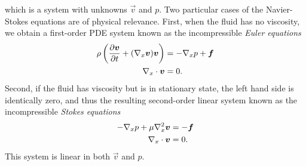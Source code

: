 which is a system with unknowns $\vec v$ and $p$. Two particular cases of the Navier-Stokes equations are of physical relevance. First, when the fluid has no viscosity, we obtain a first-order PDE system known as the incompressible \textit{Euler equations}
\begin{align*}
    \rho\left(\frac{\partial \vec v}{\partial t} + (\vx\vec v)\vec v\right) &= -\vx p + \vec f\\
    \vx\cdot\vec v &= 0.
\end{align*} 
Second, if the fluid has viscosity but is in stationary state, the left hand side is identically zero, and thus the resulting second-order linear system known as the incompressible \textit{Stokes equations}
\begin{align*}
    -\vx p + \mu\vx^2 \vec v &= - \vec f\\
    \vx\cdot\vec v &= 0.
\end{align*} 
This system is linear in both $\vec v$ and $p$. 


